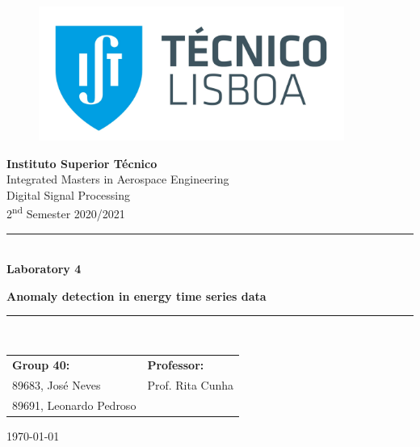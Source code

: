 \documentclass[a4paper, oneside, 11pt]{article}
\begin{document}
\begin{titlepage}
	\begin{center}
		\begin{figure}[htb!]
			\centering
				\includegraphics[width=10cm]{figures/istlogo.jpg}
		\end{figure}
        
        \LARGE{\textbf{Instituto Superior Técnico}}\\
        \vspace{20pt}
        \Large{Integrated Masters in Aerospace Engineering}\\
        \vspace{10pt}
        \Large{Digital Signal Processing}\\
        \vspace{10pt}
        \Large{2\textsuperscript{nd} Semester 2020/2021}\\
            
        \vspace{40pt}
        \noindent\rule{15cm}{1pt}\\
        \Huge{\center \textbf{Laboratory 4}} 
        \par 
        \Huge{\center \textbf{Anomaly detection in energy time series data}}\\
        \noindent\rule{15cm}{1pt}\\
        
        \vspace{60pt}
        \large{\begin{tabular}{ll}
            \textbf{Group 40:} & \textbf{Professor:} \\
            89683, José Neves & Prof. Rita Cunha\\
            89691, Leonardo Pedroso \hspace{1cm} & \\
        \end{tabular}}
    
        \vspace{60pt}
        \large{\today}
	\end{center}
\end{titlepage}
\end{document}

